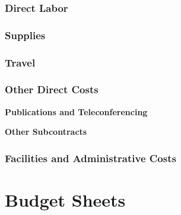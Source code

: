 \documentclass[12pt]{article}
\begin{document}
            \subsubsection{Direct Labor} 


            \subsubsection{Supplies} 

  
            \subsubsection{Travel} 


   \subsubsection{Other Direct Costs} 

{\bf Publications and Teleconferencing} \hspace{0.1in} 


{\bf Other Subcontracts} \hspace{0.1in} 

   \subsubsection{Facilities and Administrative Costs} 


\newpage

\section{Budget Sheets}
\end{document}
